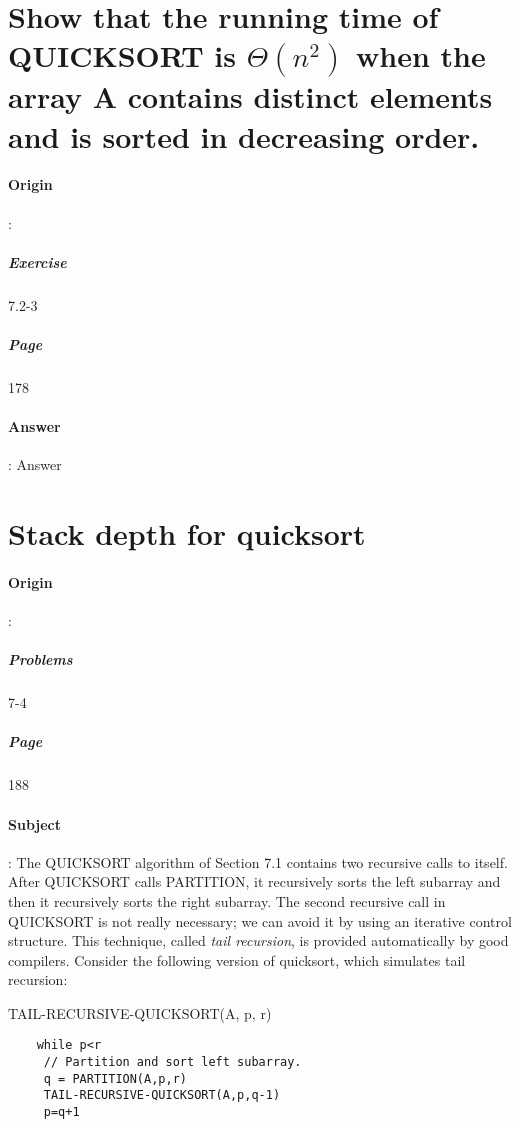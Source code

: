 \documentclass{article}
\begin{document}
  \section{Show that the running time of QUICKSORT is $\Theta(n ^ 2)$ when the array A contains distinct elements and is sorted in decreasing order.}
  \paragraph{Origin}:
    \subparagraph{Exercise}7.2-3
    \subparagraph{Page}178
  \paragraph{Answer}:
  Answer

  \section{Stack depth for quicksort}
  \paragraph{Origin}:
    \subparagraph{Problems}7-4
    \subparagraph{Page}188
  \paragraph{Subject}:
  The QUICKSORT algorithm of Section 7.1 contains two recursive calls to itself. After QUICKSORT calls PARTITION, it recursively sorts the left subarray and then it recursively sorts the right subarray. The second recursive call in QUICKSORT is not really necessary; we can avoid it by using an iterative control structure. This technique, called \textit{tail recursion}, is provided automatically by good compilers. Consider the following version of quicksort, which simulates tail recursion:

  TAIL-RECURSIVE-QUICKSORT(A, p, r)

  \begin{lstlisting}
    while p<r
     // Partition and sort left subarray.
     q = PARTITION(A,p,r)
     TAIL-RECURSIVE-QUICKSORT(A,p,q-1)
     p=q+1
  \end{lstlisting}
\end{document}

